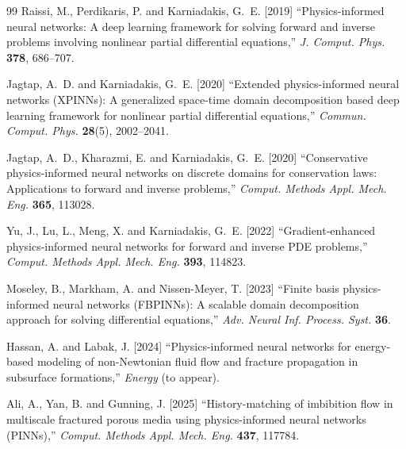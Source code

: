 \documentclass{ws-ijcm}
\begin{document}
\begin{thebibliography}{99}
Raissi, M., Perdikaris, P. and Karniadakis, G.~E. [2019] ``Physics-informed
  neural networks: A deep learning framework for solving forward and inverse
  problems involving nonlinear partial differential equations,''
  \emph{J. Comput. Phys.} \textbf{378}, 686--707.

Jagtap, A.~D. and Karniadakis, G.~E. [2020] ``Extended physics-informed neural
  networks (XPINNs): A generalized space-time domain decomposition based deep
  learning framework for nonlinear partial differential equations,''
  \emph{Commun. Comput. Phys.} \textbf{28}(5), 2002--2041.

Jagtap, A.~D., Kharazmi, E. and Karniadakis, G.~E. [2020] ``Conservative
  physics-informed neural networks on discrete domains for conservation laws:
  Applications to forward and inverse problems,''
  \emph{Comput. Methods Appl. Mech. Eng.} \textbf{365}, 113028.

Yu, J., Lu, L., Meng, X. and Karniadakis, G.~E. [2022] ``Gradient-enhanced
  physics-informed neural networks for forward and inverse PDE problems,''
  \emph{Comput. Methods Appl. Mech. Eng.} \textbf{393}, 114823.

Moseley, B., Markham, A. and Nissen-Meyer, T. [2023] ``Finite basis
  physics-informed neural networks (FBPINNs): A scalable domain decomposition
  approach for solving differential equations,''
  \emph{Adv. Neural Inf. Process. Syst.} \textbf{36}.

Hassan, A. and Labak, J. [2024] ``Physics-informed neural networks for
  energy-based modeling of non-Newtonian fluid flow and fracture propagation
  in subsurface formations,''
  \emph{Energy} (to appear).

Ali, A., Yan, B. and Gunning, J. [2025] ``History-matching of imbibition flow
  in multiscale fractured porous media using physics-informed neural networks
  (PINNs),''
  \emph{Comput. Methods Appl. Mech. Eng.} \textbf{437}, 117784.


\end{thebibliography}
\end{document}
